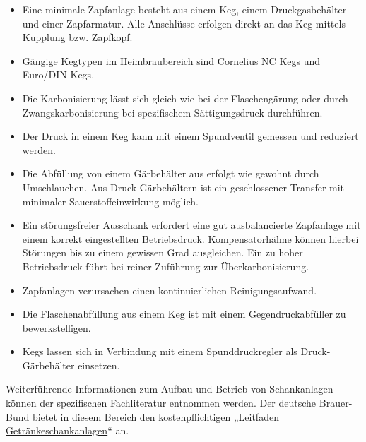 \documentclass[a4paper,parskip=half]{scrartcl}
\begin{document}
\begin{itemize}
\item Eine minimale Zapfanlage besteht aus einem Keg, einem Druckgasbehälter und einer Zapfarmatur. Alle Anschlüsse erfolgen direkt an das Keg mittels Kupplung bzw. Zapfkopf.

\item Gängige Kegtypen im Heimbraubereich sind Cornelius NC Kegs und Euro/DIN Kegs.

\item Die Karbonisierung lässt sich gleich wie bei der Flaschengärung oder durch Zwangskarbonisierung bei spezifischem Sättigungsdruck durchführen.

\item Der Druck in einem Keg kann mit einem Spundventil gemessen und reduziert werden.

\item Die Abfüllung von einem Gärbehälter aus erfolgt wie gewohnt durch Umschlauchen. Aus Druck-Gärbehältern ist ein geschlossener Transfer mit minimaler Sauerstoffeinwirkung möglich.

\item Ein störungsfreier Ausschank erfordert eine gut ausbalancierte Zapfanlage mit einem korrekt eingestellten Betriebsdruck. Kompensatorhähne können hierbei Störungen bis zu einem gewissen Grad ausgleichen. Ein zu hoher Betriebsdruck führt bei reiner  Zuführung zur Überkarbonisierung.

\item Zapfanlagen verursachen einen kontinuierlichen Reinigungsaufwand.

\item Die Flaschenabfüllung aus einem Keg ist mit einem Gegendruckabfüller zu bewerkstelligen.

\item Kegs lassen sich in Verbindung mit einem Spunddruckregler als Druck-Gärbehälter einsetzen.
\end{itemize}

Weiterführende Informationen zum Aufbau und Betrieb von Schankanlagen können der spezifischen Fachliteratur entnommen werden. Der deutsche Brauer-Bund bietet in diesem Bereich den kostenpflichtigen  „\href{https://brauer-bund.de/shop/leitfaden-getraenkeschankanlagen}{Leitfaden Getränkeschankanlagen}“ an. 

\printbibliography[title=Quellen]
\end{document}
